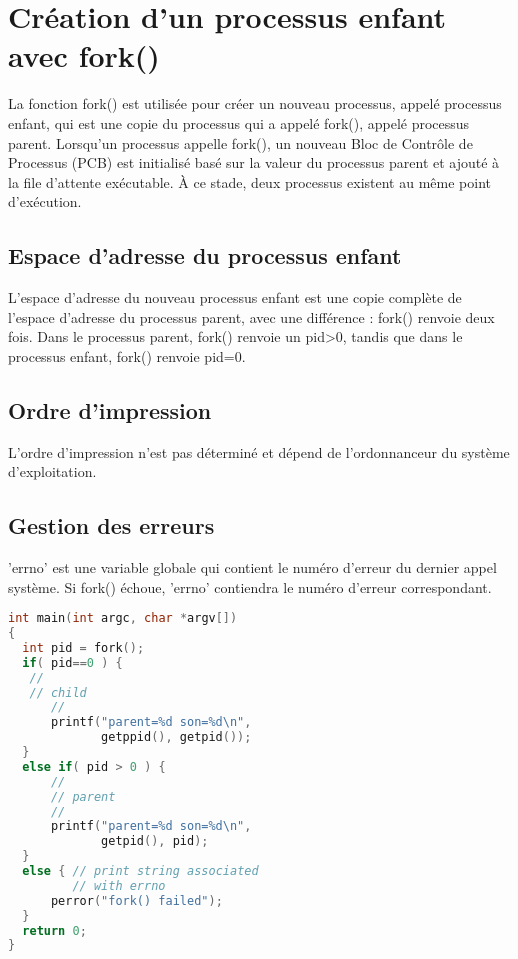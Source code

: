 \documentclass[12pt]{report}
\begin{document}
\section{Création d'un processus enfant avec fork()} 

La fonction fork() est utilisée pour créer un nouveau processus, appelé processus enfant, qui est une copie du processus qui a appelé fork(), appelé processus parent. Lorsqu'un processus appelle fork(), un nouveau Bloc de Contrôle de Processus (PCB) est initialisé basé sur la valeur du processus parent et ajouté à la file d'attente exécutable. À ce stade, deux processus existent au même point d'exécution. 

\subsection{Espace d'adresse du processus enfant} 

L'espace d'adresse du nouveau processus enfant est une copie complète de l'espace d'adresse du processus parent, avec une différence : fork() renvoie deux fois. Dans le processus parent, fork() renvoie un pid>0, tandis que dans le processus enfant, fork() renvoie pid=0. 

\subsection{Ordre d'impression} 

L'ordre d'impression n'est pas déterminé et dépend de l'ordonnanceur du système d'exploitation. 

\subsection{Gestion des erreurs} 

'errno' est une variable globale qui contient le numéro d'erreur du dernier appel système. Si fork() échoue, 'errno' contiendra le numéro d'erreur correspondant. 

\begin{lstlisting}[language=C] 
int main(int argc, char *argv[]) 
{ 
  int pid = fork(); 
  if( pid==0 ) { 
   // 
   // child 
      // 
      printf("parent=%d son=%d\n", 
             getppid(), getpid()); 
  } 
  else if( pid > 0 ) { 
      // 
      // parent 
      // 
      printf("parent=%d son=%d\n", 
             getpid(), pid); 
  } 
  else { // print string associated 
         // with errno   
      perror("fork() failed");  
  } 
  return 0; 
} 
\end{lstlisting}
\end{document}
